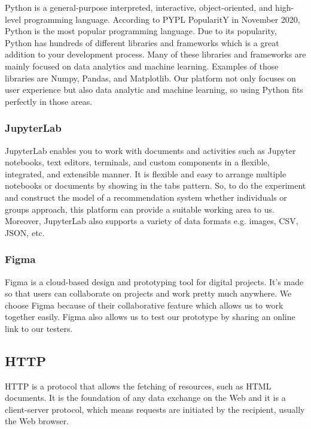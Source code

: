 \documentclass[12pt,oneside,openright,a4paper]{cpe-english-project}
\begin{document}
Python is a general-purpose interpreted, interactive, object-oriented, and high-level programming language. \cite{PythonTutorial} According to PYPL PopularitY in November 2020, Python is the most popular programming language. Due to its popularity, Python has hundreds of different libraries and frameworks which is a great addition to your development process. \cite{Top7ReasonsWhyYouNeedtoLearnPythonasaDataScientist} Many of these libraries and frameworks are mainly focused on data analytics and machine learning. Examples of those libraries are Numpy, Pandas, and Matplotlib. Our platform not only focuses on user experience but also data analytic and machine learning, so using Python fits perfectly in those areas.

\subsubsection{JupyterLab}

JupyterLab enables you to work with documents and activities such as Jupyter notebooks, text editors, terminals, and custom components in a flexible, integrated, and extensible manner. \cite{JupyterLabOverview} It is flexible and easy to arrange multiple notebooks or documents by showing in the tabs pattern. So, to do the experiment and construct the model of a recommendation system whether individuals or groups approach, this platform can provide a suitable working area to us. Moreover, JupyterLab also supports a variety of data formats e.g. images, CSV, JSON, etc.

\subsubsection{Figma}

Figma is a cloud-based design and prototyping tool for digital projects. It’s made so that users can collaborate on projects and work pretty much anywhere. \cite{WhatIsFigmaa101Intro} We choose Figma because of their collaborative feature which allows us to work together easily. Figma also allows us to test our prototype by sharing an online link to our testers.


\subsection{HTTP}

HTTP is a protocol that allows the fetching of resources, such as HTML documents. It is the foundation of any data exchange on the Web and it is a client-server protocol, which means requests are initiated by the recipient, usually the Web browser. \cite{AnoverviewofHTTP}
\end{document}
